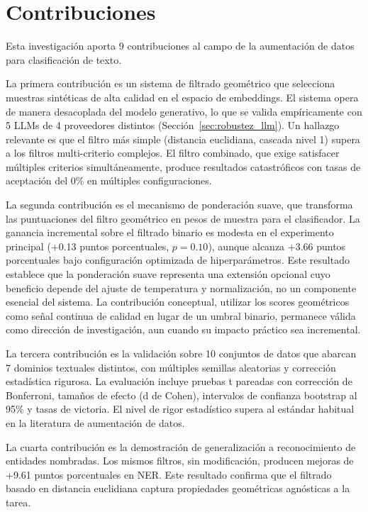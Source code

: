 \section{Contribuciones}
\label{sec:contribuciones}

Esta investigación aporta 9 contribuciones al campo de la aumentación de datos para clasificación de texto.

La primera contribución es un sistema de filtrado geométrico que selecciona muestras sintéticas de alta calidad en el espacio de embeddings. El sistema opera de manera desacoplada del modelo generativo, lo que se valida empíricamente con 5 LLMs de 4 proveedores distintos (Sección~\ref{sec:robustez_llm}). Un hallazgo relevante es que el filtro más simple (distancia euclidiana, cascada nivel 1) supera a los filtros multi-criterio complejos. El filtro combinado, que exige satisfacer múltiples criterios simultáneamente, produce resultados catastróficos con tasas de aceptación del 0\% en múltiples configuraciones.

La segunda contribución es el mecanismo de ponderación suave, que transforma las puntuaciones del filtro geométrico en pesos de muestra para el clasificador. La ganancia incremental sobre el filtrado binario es modesta en el experimento principal (+0.13 puntos porcentuales, $p = 0.10$), aunque alcanza +3.66 puntos porcentuales bajo configuración optimizada de hiperparámetros. Este resultado establece que la ponderación suave representa una extensión opcional cuyo beneficio depende del ajuste de temperatura y normalización, no un componente esencial del sistema. La contribución conceptual, utilizar los scores geométricos como señal continua de calidad en lugar de un umbral binario, permanece válida como dirección de investigación, aun cuando su impacto práctico sea incremental.

La tercera contribución es la validación sobre 10 conjuntos de datos que abarcan 7 dominios textuales distintos, con múltiples semillas aleatorias y corrección estadística rigurosa. La evaluación incluye pruebas t pareadas con corrección de Bonferroni, tamaños de efecto (d de Cohen), intervalos de confianza bootstrap al 95\% y tasas de victoria. El nivel de rigor estadístico supera al estándar habitual en la literatura de aumentación de datos.

La cuarta contribución es la demostración de generalización a reconocimiento de entidades nombradas. Los mismos filtros, sin modificación, producen mejoras de +9.61 puntos porcentuales en NER. Este resultado confirma que el filtrado basado en distancia euclidiana captura propiedades geométricas agnósticas a la tarea.

